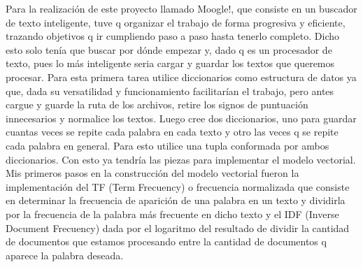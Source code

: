 \documentclass{article}
\begin{document}
 Para la realización de este proyecto llamado Moogle!, que consiste en un buscador 
de texto inteligente, tuve q organizar el trabajo de forma progresiva y eficiente, 
trazando objetivos q ir cumpliendo paso a paso hasta tenerlo completo. Dicho esto 
solo tenía que buscar por dónde empezar y, dado q es un procesador de texto, pues 
lo más inteligente seria cargar y guardar los textos que queremos procesar.
Para esta primera tarea utilice diccionarios como estructura de datos ya que, dada su 
versatilidad y funcionamiento facilitarían el trabajo, pero antes cargue y guarde la 
ruta de los archivos, retire los signos de puntuación innecesarios y normalice los 
textos.
Luego cree dos diccionarios, uno para guardar cuantas veces se repite cada palabra 
en cada texto y otro las veces q se repite cada palabra en general. Para esto utilice 
una tupla conformada por ambos diccionarios.
Con esto ya tendría las piezas para implementar el modelo vectorial.
Mis primeros pasos en la construcción del modelo vectorial fueron la implementación 
del TF (Term Frecuency) o frecuencia normalizada que consiste en determinar la 
frecuencia de aparición de una palabra en un texto y dividirla por la frecuencia de la 
palabra más frecuente en dicho texto y el IDF (Inverse Document Frecuency) dada por 
el logaritmo del resultado de dividir la cantidad de documentos que estamos 
procesando entre la cantidad de documentos q aparece la palabra deseada.
\end{document}
